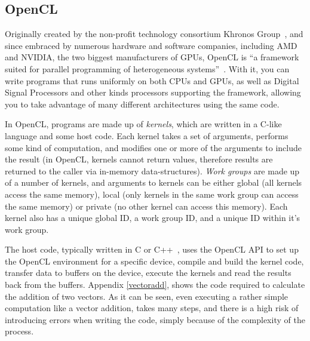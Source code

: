 \subsection{OpenCL}

Originally created by the non-profit technology consortium Khronos
Group~\cite{khronos}, and since embraced by numerous hardware and
software companies, including AMD and NVIDIA, the two biggest
manufacturers of GPUs, OpenCL is ``a framework suited for parallel
programming of heterogeneous systems''~\cite{opencl-quote}. With it,
you can write programs that runs uniformly on both CPUs and GPUs, as
well as Digital Signal Processors and other kinds processors
supporting the framework, allowing you to take advantage of many
different architectures using the same code.

In OpenCL, programs are made up of \emph{kernels}, which are written
in a C-like language and some host code. Each kernel takes a set of
arguments, performs some kind of computation, and modifies one or more
of the arguments to include the result (in OpenCL, kernels cannot
return values, therefore results are returned to the caller via
in-memory data-structures). \emph{Work groups} are made up of a number
of kernels, and arguments to kernels can be either global (all kernels
access the same memory), local (only kernels in the same work group
can access the same memory) or private (no other kernel can access
this memory). Each kernel also has a unique global ID, a work group
ID, and a unique ID within it's work group.

The host code, typically written in C or C++~\cite{hostlang}, uses the
OpenCL API to set up the OpenCL environment for a specific device,
compile and build the kernel code, transfer data to buffers on the
device, execute the kernels and read the results back from the
buffers. Appendix \ref{vectoradd}, shows the code required to
calculate the addition of two vectors. As it can be seen, even
executing a rather simple computation like a vector addition, takes
many steps, and there is a high risk of introducing errors when
writing the code, simply because of the complexity of the process.
